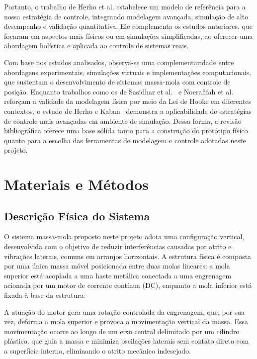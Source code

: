 \documentclass[9pt,a4paper,twocolumn,twoside]{tau-class/tau}
\begin{document}
    Portanto, o trabalho de Herho et al. estabelece um modelo de referência para a nossa estratégia de controle, integrando modelagem avançada, simulação de alto desempenho e validação quantitativa. Ele complementa os estudos anteriores, que focaram em aspectos mais físicos ou em simulações simplificadas, ao oferecer uma abordagem holística e aplicada ao controle de sistemas reais.

    Com base nos estudos analisados, observa-se uma complementaridade entre abordagens experimentais, simulações virtuais e implementações computacionais, que sustentam o desenvolvimento de sistemas massa-mola com controle de posição. Enquanto trabalhos como os de Sasidhar et al.~\cite{sasidhar2025} e Noerafifah et al.~\cite{noerafifah2025} reforçam a validade da modelagem física por meio da Lei de Hooke em diferentes contextos, o estudo de Herho e Kaban~\cite{herho2025} demonstra a aplicabilidade de estratégias de controle mais avançadas em ambiente de simulação. Dessa forma, a revisão bibliográfica oferece uma base sólida tanto para a construção do protótipo físico quanto para a escolha das ferramentas de modelagem e controle adotadas neste projeto.
    
\section{Materiais e Métodos}

    \subsection{Descrição Física do Sistema}
    O sistema massa-mola proposto neste projeto adota uma configuração vertical, desenvolvida com o objetivo de reduzir interferências causadas por atrito e vibrações laterais, comuns em arranjos horizontais. A estrutura física é composta por uma única massa móvel posicionada entre duas molas lineares: a mola superior está acoplada a uma haste metálica conectada a uma engrenagem acionada por um motor de corrente contínua (DC), enquanto a mola inferior está fixada à base da estrutura.

    A atuação do motor gera uma rotação controlada da engrenagem, que, por sua vez, deforma a mola superior e provoca a movimentação vertical da massa. Essa movimentação ocorre ao longo de um eixo central delimitado por um cilindro plástico, que guia a massa e minimiza oscilações laterais sem contato direto com a superfície interna, eliminando o atrito mecânico indesejado.
\end{document}
